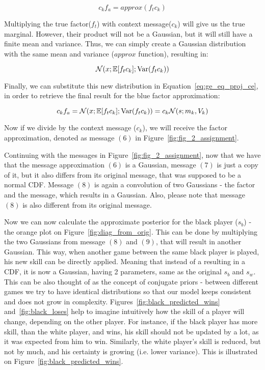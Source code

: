 \documentclass[a4paper,11pt]{article}
\theoremstyle{mytheor}
\newcommand{\E}{\Bbb{E}}
\newcommand{\Var}{\mathrm{Var}}
\begin{document}
\begin{equation}
    \label{eq:ge_eq_proj_ce}
    c_kf_a = approx(f_tc_k)
\end{equation}

Multiplying the true factor($f_t$) with context message($c_k$) will give us the true marginal. However, their product will not be a Gaussian, but it will still have a finite mean and variance. Thus, we can simply create a Gaussian distribution with the same mean and variance ($approx$ function), resulting in:

\begin{equation}
    \label{eq:approx_gaus}
    \mathcal{N}(x;\E[f_tc_k];\Var(f_tc_k))
\end{equation}

Finally, we can substitute this new distribution in Equation~\ref{eq:ge_eq_proj_ce}, in order to retrieve the final result for the blue factor approximation:

\begin{equation}
    \label{eq:g_eq_proj_ce_div_c}
    c_kf_a = \mathcal{N}(x;\E[f_tc_k];\Var(f_tc_k))=c_k\mathcal{N}(s;m_k,V_k)
\end{equation}

Now if we divide by the context message ($c_k$), we will receive the factor approximation, denoted as message $(6)$ in Figure~\ref{fig:fig_2_assignment}.

Continuing with the messages in Figure~\ref{fig:fig_2_assignment}, now that we have that the message approximation $(6)$ is a Gaussian, message $(7)$ is just a copy of it, but it also differs from its original message, that was supposed to be a normal CDF. Message $(8)$ is again a convolution of two Gaussians - the factor and the message, which results in a Gaussian. Also, please note that message $(8)$ is also different from its original message. 

Now we can now calculate the approximate posterior for the black player ($s_b$) - the orange plot on Figure~\ref{fig:diag_from_orig}. This can be done by multiplying the two Gaussians from message $(8)$ and $(9)$, that will result in another Gaussian. This way, when another game between the same black player is played, his new skill can be directly applied. Meaning that instead of a resulting in a CDF, it is now a Gaussian, having 2 parameters, same as the original $s_b$ and $s_w$. This can be also thought of as the concept of conjugate priors - between different games we try to have identical distributions so that our model keeps consistent and does not grow in complexity. Figures~\ref{fig:black_predicted_wins} and~\ref{fig:black_loses} help to imagine intuitively how the skill of a player will change, depending on the other player. For instance, 
if the black player has more skill, than the white player, and wins, his skill should not be updated by a lot, as it was expected from him to win. Similarly, the white player's skill is reduced, but not by much, and his certainty is growing (i.e. lower variance). This is illustrated on Figure~\ref{fig:black_predicted_wins}.
\end{document}
